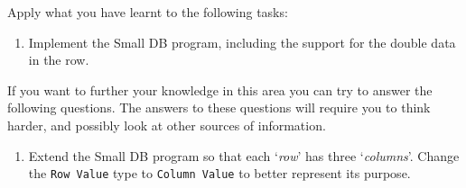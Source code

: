 \clearpage
Apply what you have learnt to the following tasks:

\begin{enumerate}
  \item Implement the Small DB program, including the support for the double data in the row.
\end{enumerate}

\bigskip

If you want to further your knowledge in this area you can try to answer the following questions. The answers to these questions will require you to think harder, and possibly look at other sources of information.

\begin{enumerate}
  \item Extend the Small DB program so that each `\emph{row}' has three `\emph{columns}'. Change the \texttt{Row Value} type to \texttt{Column Value} to better represent its purpose.
\end{enumerate}